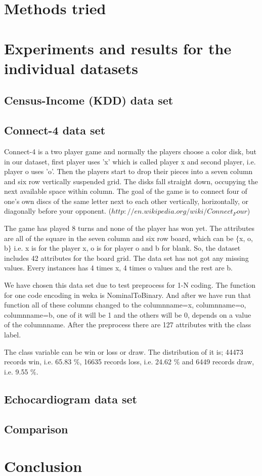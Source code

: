 \documentclass[a4paper]{article}
\begin{document}
\section{Methods tried}


\section{Experiments and results for the individual datasets}

\subsection{Census-Income (KDD) data set}

\subsection{Connect-4 data set}

Connect-4 is a two player game and normally the players choose a color disk, but in our dataset, first player uses 'x' which is called player x and second player, i.e. player o uses 'o'. Then the players start to drop their pieces into a seven column and six row vertically suspended grid. The disks fall straight down, occupying the next available space within column. The goal of the game is to connect four of one's own discs of the same letter next to each other vertically, horizontally, or diagonally before your opponent. ($http://en.wikipedia.org/wiki/Connect_Four$) 

The game has played 8 turns and none of the player has won yet. The attributes are all of the square in the seven column and six row board, which can be $\{$x, o, b$\}$ i.e. x is for the player x, o is for player o and b for blank. So, the dataset includes 42 attributes for the board grid. The data set has not got any missing values. Every instances has 4 times x, 4 times o values and the rest are b. 

We have chosen this data set due to test preprocess for 1-N coding. The function for one code encoding in weka is NominalToBinary. And after we have run that function all of these columns changed to the columnname=x, columnname=o, columnname=b, one of it will be 1 and the others will be 0, depends on a value of the columnname. After the preprocess there are 127 attributes with the class label. 

The class variable can be win or loss or draw. The distribution of it is; 44473 records win, i.e. 65.83 $\%$, 16635 records loss,  i.e. 24.62 $\%$ and 6449 records draw,  i.e. 9.55 $\%$.


\subsection{Echocardiogram data set}

\subsection{Comparison}

\section{Conclusion}
\end{document}
